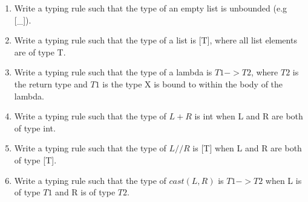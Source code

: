 \documentclass[a4paper]{exam}
\begin{document}
\begin{enumerate}
  \item Write a typing rule such that the type of an empty list is unbounded (e.g [\_]).

        \begin{solution}

        \end{solution}

  \item  Write a typing rule such that the type of a list is [T], where all list elements are of type T.

        \begin{solution}

        \end{solution}

  \item Write a typing rule such that the type of a lambda is $T1->T2$, where $T2$ is the return type and $T1$ is the type X is bound to within the body of the lambda.

        \begin{solution}

        \end{solution}

  \item Write a typing rule such that the type of $L + R$ is int when L and R are both of type int.

        \begin{solution}

        \end{solution}

  \item Write a typing rule such that the type of $L // R$ is [T] when L and R are both of type [T].

        \begin{solution}

        \end{solution}
  \item Write a typing rule such that the type of $cast(L,R)$ is $T1 -> T2$ when L is of type $T1$ and R is of type $T2$.

        \begin{solution}

        \end{solution}

\end{enumerate}
\end{document}
